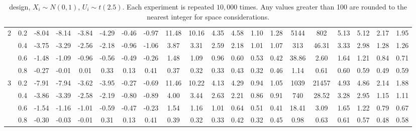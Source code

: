 \begin{table}
\begin{threeparttable}
\begin{tabular}{c c|c c c c c c|c c c c c c|c c c c c c}
\hline
\multirow{4}{*}{2} & 0.2 & -8.04 & -8.14 & -3.84 & -4.29 & -0.46 & -0.97 & 11.48 & 10.16 & 4.35 & 4.58 & 1.10 & 1.28 & 5144 & 802 & 5.13 & 5.12 & 2.17 & 1.95 \\
& 0.4 & -3.75 & -3.29 & -2.56 & -2.18 & -0.96 & -1.06 & 3.87 & 3.31 & 2.59 & 2.18 & 1.01 & 1.07 & 313 & 46.31 & 3.33 & 2.98 & 1.28 & 1.26 \\
& 0.6 & -1.48 & -1.09 & -0.96 & -0.56 & -0.49 & -0.26 & 1.48 & 1.09 & 0.96 & 0.60 & 0.53 & 0.42 & 38.86 & 2.60 & 1.64 & 1.21 & 0.84 & 0.71 \\
& 0.8 & -0.27 & -0.01 & 0.01 & 0.33 & 0.13 & 0.41 & 0.37 & 0.32 & 0.33 & 0.43 & 0.32 & 0.46 & 1.14 & 0.61 & 0.60 & 0.59 & 0.49 & 0.59 \\
\hline
\multirow{4}{*}{3} & 0.2 & -7.91 & -7.94 & -3.62 & -3.95 & -0.27 & -0.69 & 11.46 & 10.22 & 4.13 & 4.29 & 0.94 & 1.05 & 1039 & 21457 & 4.93 & 4.86 & 2.14 & 1.88 \\
& 0.4 & -3.86 & -3.39 & -2.58 & -2.19 & -0.80 & -0.89 & 4.00 & 3.44 & 2.63 & 2.21 & 0.86 & 0.91 & 740 & 28.52 & 3.28 & 2.95 & 1.15 & 1.11 \\
& 0.6 & -1.54 & -1.16 & -1.01 & -0.59 & -0.47 & -0.23 & 1.54 & 1.16 & 1.01 & 0.64 & 0.51 & 0.41 & 18.41 & 3.09 & 1.65 & 1.22 & 0.79 & 0.67 \\
& 0.8 & -0.30 & -0.03 & -0.01 & 0.31 & 0.13 & 0.41 & 0.39 & 0.32 & 0.33 & 0.42 & 0.32 & 0.45 & 0.98 & 0.63 & 0.61 & 0.57 & 0.48 & 0.58 \\
\hline
\hline
\end{tabular}
\caption*{\citet{ludwig2007does} design, $X_i \sim N(0,1)$, $U_i \sim t(2.5)$. Each experiment is repeated $10,000$ times. Any values greater than 100 are rounded to the nearest integer for space considerations.}
\label{table estimation lm normal t}
\end{threeparttable}
\end{table}
